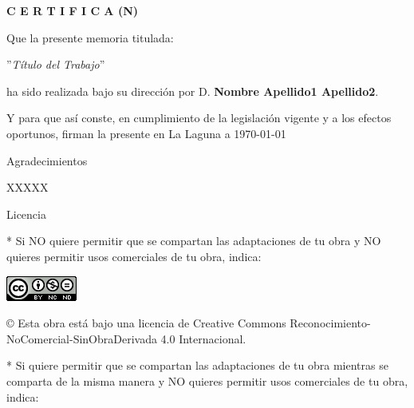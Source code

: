 \documentclass[spanish,a4paper,12pt,oneside]{scrbook}
\begin{document}
\bigskip
\bigskip
\textbf{C E R T I F I C A (N)}

\bigskip
\bigskip
Que la presente memoria titulada:

\bigskip
''\textit{Título del Trabajo}''

\bigskip
\bigskip
\bigskip

\noindent ha sido realizada bajo su dirección por D. \textbf{Nombre Apellido1 Apellido2}.

\bigskip
\bigskip

Y para que así conste, en cumplimiento de la legislación vigente y a los efectos
oportunos, firman la presente en La Laguna a \today

\thispagestyle{empty}

{ \flushright

\begin{LARGE}
Agradecimientos
\end{LARGE}

\hspace{3mm}

\begin{large}
XXXXX
\end{large}

}
\newpage
{}
\thispagestyle{empty}

\bigskip
\begin{LARGE}
Licencia
\end{LARGE}

\bigskip
* Si NO quiere permitir que se compartan las adaptaciones de tu obra y NO quieres permitir usos comerciales de tu obra, indica:

\begin{center}
\includegraphics[scale=1.8]{images/by-nc-nd_88x31}\\[5mm]
\end{center}

\begin{large}
© Esta obra está bajo una licencia de Creative Commons Reconocimiento-NoComercial-SinObraDerivada 4.0 Internacional.
\end{large}

\bigskip
\bigskip
\bigskip
* Si quiere permitir que se compartan las adaptaciones de tu obra mientras se comparta de la misma manera y NO quieres permitir usos comerciales de tu obra, indica:
\end{document}
